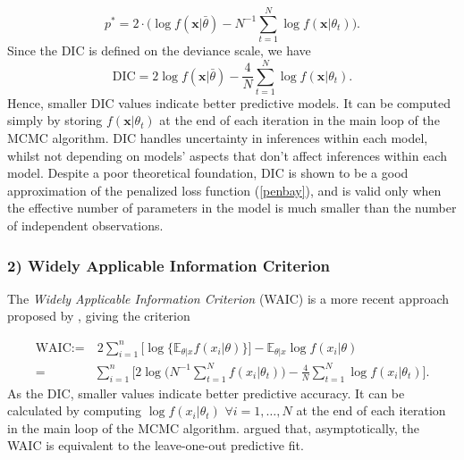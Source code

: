 \begin{equation*}
p^*=2\cdot \bigg(\log f(\boldsymbol{x}|\bar{\theta})-N^{-1}\sum_{t=1}^N\log f(\boldsymbol{x}|\theta_t)\bigg).
\end{equation*}
Since the DIC is defined on the deviance scale, we have
\begin{equation}
\text{DIC}= 2\log f(\boldsymbol{x}|\bar{\theta}) - \frac{4}{N} \sum_{t=1}^N\log f(\boldsymbol{x}|\theta_t).
\end{equation}
Hence, smaller DIC values indicate better predictive models. It can be computed simply by storing $f(\boldsymbol{x}|\theta_t) $ at the end of each iteration in the main loop of the MCMC algorithm. DIC
handles uncertainty in inferences within each model, whilst not depending on models' aspects that don’t affect inferences within each model. Despite a poor theoretical foundation, DIC is shown to be a good approximation of the penalized loss function (\ref{penbay}), and is valid only when the effective number of parameters in the model is much smaller than the number of independent observations.


\subsubsection*{2) Widely Applicable Information Criterion}

The \emph{Widely Applicable Information Criterion} (WAIC) is a more recent approach proposed by \citet{Watanabe_asymptotic_2010}, giving the criterion  


\begin{equation}
\begin{aligned}
\text{WAIC}:= & \ 2 \sum_{i=1}^n\Big[\log\big\{\mathbb{E}_{\theta|x}f(x_i|\theta)\big\}\Big]- \mathbb{E}_{\theta|x}\log f(x_i|\theta) \\
= &\sum_{i=1}^n\Bigg[2\log \bigg(N^{-1}\sum_{t=1}^N f(x_i|\theta_t)\bigg)-\frac{4}{N}\sum_{t=1}^N\log f(x_i|\theta_t)\Bigg].
\end{aligned}
\end{equation}
As the DIC, smaller values indicate better predictive accuracy. It can be calculated by computing $\log f(x_i|\theta_t)$ $\forall i=1,\ldots,N$ at the end of each iteration in the main loop of the MCMC algorithm.
\citet{watanabe_asymptotic_2010} argued that, asymptotically, the WAIC is equivalent to the leave-one-out predictive fit.

